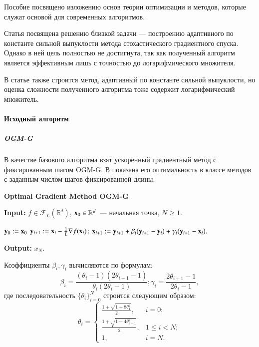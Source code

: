 \documentclass{crm-article}
\begin{document}
Пособие \cite{nesterov2010introductory} посвящено изложению основ теории оптимизации и методов, которые служат основой для современных алгоритмов.

Статья \cite{lei2019jordan} посвящена решению близкой задачи --- построению адаптивного по константе сильной выпуклости метода стохастического градиентного спуска. Однако в ней цель полностью не достигнута, так как полученный алгоритм является эффективным лишь с точностью до логарифмического множителя.

В статье \cite{fercoq2016qu} также строится метод, адаптивный по константе сильной выпуклости, но оценка сложности полученного алгоритма тоже содержит логарифмический множитель.

\paragraph{Исходный алгоритм}
\subparagraph{OGM-G}

В качестве базового алгоритма взят ускоренный градиентный метод с фиксированным шагом OGM-G. В \cite{kim2018fessler} показана его оптимальность в классе методов с заданным числом шагов фиксированной длины.

\begin{algorithm}
\caption{\bf{Optimal Gradient Method OGM-G}}
\label{OGM-G}
\hspace*{\algorithmicindent} \textbf{Input: }$f\in \mathcal{F}_L(\mathbb{R}^d)$, ${\bf x}_0\in\mathbb{R}^d$~--- начальная точка, $N\geq 1$.
\begin{algorithmic}[1]
\STATE ${\bf y}_0 := {\bf x}_0$
\STATE ${\bf y}_{i+1} := {\bf x}_i - \frac{1}{L}\nabla f({\bf x}_i)$;
\STATE ${\bf x}_{i+1} := {\bf y}_{i+1} + \beta_i({\bf y}_{i+1} - {\bf y}_i) + \gamma_i({\bf y}_{i+1} - {\bf x}_i).$
\ENDFOR
\end{algorithmic}
\hspace*{\algorithmicindent} \textbf{Output: } $x_N$.
\end{algorithm}

Коэффициенты $\beta_i, \gamma_i$ вычисляются по формулам:
$$\beta_i = \dfrac{(\theta_i-1)(2\theta_{i+1}-1)}{\theta_i(2\theta_i-1)}; \gamma_i = \dfrac{2\theta_{i+1}-1}{2\theta_i-1},$$
где последовательность $\{\theta_i\}_{i=0}^N$ строится следующим образом:
\[ \theta_i = \begin{cases}
\frac{1+\sqrt{1+8\theta_1^2}}{2}, & i=0;\\
\frac{1+\sqrt{1+4\theta_{i+1}^2}}{2}, & 1\leq i<N;\\
1, & i=N.
\end{cases} \]
\end{document}

